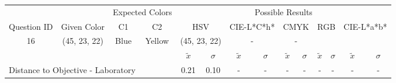 \begin{table}[H]
  \resizebox{\textwidth}{!} {
  \begin{tabular}{lccccccccccccc}
    \hline
    \multicolumn{1}{c}{}                              &                                      & \multicolumn{2}{c}{Expected Colors}                   & \multicolumn{10}{c}{Possible Results}                                                                                                                                                                                                                                                                                        \\ \cline{3-14}
    \multicolumn{1}{c}{\multirow{-2}{*}{Question ID}} & \multirow{-2}{*}{Given Color}        & C1                       & C2                         & \multicolumn{2}{c}{HSV}                                        & \multicolumn{2}{c}{CIE-L*C*h*}                                 & \multicolumn{2}{c}{CMYK}                                       & \multicolumn{2}{c}{RGB}                                        & \multicolumn{2}{c}{CIE-L*a*b*}                                 \\ \hline
    \multicolumn{1}{c}{16}                             & \cellcolor[HTML]{FF007F}(45, 23, 22) & \multicolumn{1}{c|}{Blue} & \multicolumn{1}{c|}{Yellow}  & \multicolumn{2}{c|}{\cellcolor[HTML]{FF007F}(45, 23, 22)}      & \multicolumn{2}{c|}{-}       & \multicolumn{2}{c|}{-}       & \multicolumn{2}{c|}{}       & \multicolumn{2}{c|}{}       \\ \hline
                                                      & \multicolumn{1}{l}{}                 & \multicolumn{1}{l}{}     & \multicolumn{1}{l}{}       & \multicolumn{1}{c}{$\tilde{x}$} & \multicolumn{1}{c}{$\sigma$} & \multicolumn{1}{c}{$\tilde{x}$} & \multicolumn{1}{c}{$\sigma$} & \multicolumn{1}{c}{$\tilde{x}$} & \multicolumn{1}{c}{$\sigma$} & \multicolumn{1}{c}{$\tilde{x}$} & \multicolumn{1}{c}{$\sigma$} & \multicolumn{1}{c}{$\tilde{x}$} & \multicolumn{1}{c}{$\sigma$} \\ \hline
    \multicolumn{4}{l}{Distance to Objective - Laboratory}                                                                                           & \multicolumn{1}{|c}{0.21}       & \multicolumn{1}{c|}{0.10}    & \multicolumn{1}{|c}{-}       & \multicolumn{1}{c|}{-}    & \multicolumn{1}{|c}{-}       & \multicolumn{1}{c|}{-}    & \multicolumn{1}{|c}{-}       & \multicolumn{1}{c|}{-}    & \multicolumn{1}{|c}{-}       & \multicolumn{1}{c|}{-}    \\

\end{tabular}}
\end{table}
